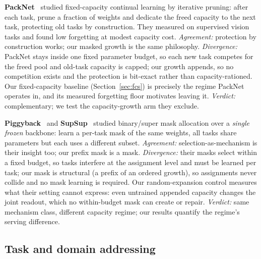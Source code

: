 \documentclass[11pt]{article}
\theoremstyle{definition}\newtheorem{definition}{Definition}
\theoremstyle{remark}\newtheorem{remark}{Remark}
\begin{document}
\textbf{PackNet}~\cite{packnet} studied fixed-capacity continual learning by iterative
pruning: after each task, prune a fraction of weights and dedicate the freed capacity to
the next task, protecting old tasks by construction. They measured on supervised vision
tasks and found low forgetting at modest capacity cost. \emph{Agreement:} protection by
construction works; our masked growth is the same philosophy. \emph{Divergence:} PackNet
stays inside one fixed parameter budget, so each new task competes for the freed pool and
old-task capacity is capped; our growth appends, so no competition exists and the
protection is bit-exact rather than capacity-rationed. Our fixed-capacity baseline
(Section~\ref{sec:fcs}) is precisely the regime PackNet operates in, and its
measured forgetting floor motivates leaving it. \emph{Verdict:} complementary; we test the
capacity-growth arm they exclude.

\textbf{Piggyback}~\cite{piggyback} and \textbf{SupSup}~\cite{supsup} studied
binary/super mask allocation over a \emph{single frozen} backbone: learn a per-task mask
of the same weights, all tasks share parameters but each uses a different subset.
\emph{Agreement:} selection-as-mechanism is their insight too; our prefix mask is a
mask. \emph{Divergence:} their masks select within a fixed budget, so tasks interfere at
the assignment level and must be learned per task; our mask is structural (a prefix of an
ordered growth), so assignments never collide and no mask learning is required. Our
random-expansion control measures what their setting cannot express: even untrained
appended capacity changes the joint readout, which no within-budget mask can create or
repair. \emph{Verdict:} same mechanism class, different capacity regime; our results
quantify the regime's serving difference.

\subsection{Task and domain addressing}
\label{sec:prior:addressing}
\end{document}
